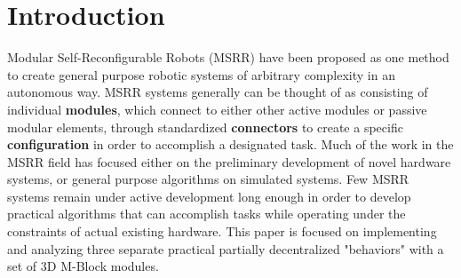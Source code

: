 \section{Introduction}
\label{sec:Introduction}

Modular Self-Reconfigurable Robots (MSRR) have been proposed as one method to create general purpose robotic systems of arbitrary complexity in an autonomous way. MSRR systems generally can be thought of as consisting of individual \textbf{modules}, which connect to either other active modules or passive modular elements, through standardized \textbf{connectors} to create a specific \textbf{configuration} in order to accomplish a designated task. Much of the work in the MSRR field has focused either on the preliminary development of novel hardware systems, or general purpose algorithms on simulated systems. Few MSRR systems remain under active development long enough in order to develop practical algorithms that can accomplish tasks while operating under the constraints of actual existing hardware. This paper is focused on implementing and analyzing three separate practical partially decentralized "behaviors" with a set of 3D M-Block modules.

